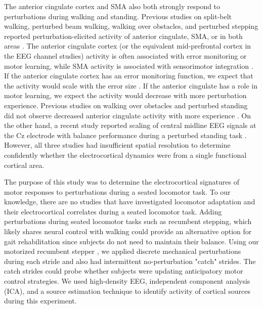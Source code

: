 \documentclass[shortpaper,twoside,web]{ieeecolor}
\begin{document}
The anterior cingulate cortex and SMA also both strongly respond to perturbations during walking and standing. Previous studies on split-belt walking, perturbed beam walking, walking over obstacles, and perturbed stepping reported perturbation-elicited activity of anterior cingulate, SMA, or in both areas \cite{Haefeli2011-ym,Bulea2015-dv,Marchal-Crespo2017-fn,Peterson2018-ht,Hinton2019-gg,Nordin2019-ar}. The anterior cingulate cortex (or the equivalent mid-prefrontal cortex in the EEG channel studies) activity is often associated with error monitoring or motor learning, while SMA activity is associated with sensorimotor integration \cite{Ridderinkhof2004-jx,Galea2011-jf,Peterson2018-ht}. If the anterior cingulate cortex has an error monitoring function, we expect that the activity would scale with the error size \cite{Arrighi2016-yb}. If the anterior cingulate has a role in motor learning, we expect the activity would decrease with more perturbation experience. Previous studies on walking over obstacles and perturbed standing did not observe decreased anterior cingulate activity with more experience \cite{Haefeli2011-ym,Mierau2015-fd}. On the other hand, a recent study reported scaling of central midline EEG signals at the Cz electrode with balance performance during a perturbed standing task \cite{Payne2020-hl}. However, all three studies had insufficient spatial resolution to determine confidently whether the electrocortical dynamics were from a single functional cortical area.

The purpose of this study was to determine the electrocortical signatures of motor responses to perturbations during a seated locomotor task. To our knowledge, there are no studies that have investigated locomotor adaptation and their electrocortical correlates during a seated locomotor task. Adding perturbations during seated locomotor tasks such as recumbent stepping, which likely shares neural control with walking \cite{Stoloff2007-da,Zehr2007-ww} could provide an alternative option for gait rehabilitation since subjects do not need to maintain their balance. Using our motorized recumbent stepper \cite{Huang2009-of}, we applied discrete mechanical perturbations during each stride and also had intermittent no-perturbation "catch" strides. The catch strides could probe whether subjects were updating anticipatory motor control strategies. We used high-density EEG, independent component analysis (ICA), and a source estimation technique to identify activity of cortical sources during this experiment.
\end{document}
